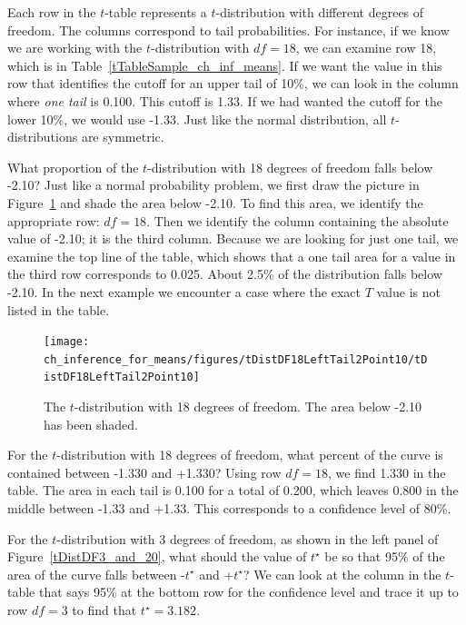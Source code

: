 Each row in the $t$-table represents a $t$-distribution with different degrees of freedom. The columns correspond to tail probabilities. For instance, if we know we are working with the $t$-distribution with $df=18$, we can examine row 18, which is  in Table~\ref{tTableSample_ch_inf_means}. If we want the value in this row that identifies the cutoff for an upper tail of 10\%, we can look in the column where \emph{one tail} is 0.100. This cutoff is 1.33. If we had wanted the cutoff for the lower 10\%, we would use -1.33. Just like the normal distribution, all $t$-distributions are symmetric.


\begin{example}{What proportion of the $t$-distribution with 18 degrees of freedom falls below -2.10?}
Just like a normal probability problem, we first draw the picture in Figure~\ref{tDistDF18LeftTail2Point10} and shade the area below -2.10. To find this area, we identify the appropriate row: $df=18$. Then we identify the column containing the absolute value of -2.10; it is the third column. Because we are looking for just one tail, we examine the top line of the table, which shows that a one tail area for a value in the third row corresponds to 0.025. About 2.5\% of the distribution falls below -2.10. In the next example we encounter a case where the exact $T$ value is not listed in the table.
\end{example}

\begin{figure}
\centering
\texttt{[image: ch\_inference\_for\_means/figures/tDistDF18LeftTail2Point10/tDistDF18LeftTail2Point10]}
\caption{The $t$-distribution with 18 degrees of freedom. The area below -2.10 has been shaded.}
\label{tDistDF18LeftTail2Point10}
\end{figure}

\begin{example}{For the $t$-distribution with 18 degrees of freedom, what percent of the curve is contained between -1.330 and +1.330?}
Using row $df = 18$, we find 1.330 in the table. The area in each tail is 0.100 for a total of 0.200, which leaves 0.800 in the middle between -1.33 and +1.33. This corresponds to a confidence level of 80\%.
\end{example}

\begin{example}{For the $t$-distribution with 3 degrees of freedom, as shown in the left panel of Figure~\ref{tDistDF3_and_20}, what should the value of $t^{\star}$ be so that 95\% of the area of the curve falls between -$t^{\star}$ and +$t^{\star}$?}
We can look at the column in the $t$-table that says 95\% at the bottom row for the confidence level and trace it up to row $df = 3$ to find that $t^{\star} = 3.182$.
\end{example}

